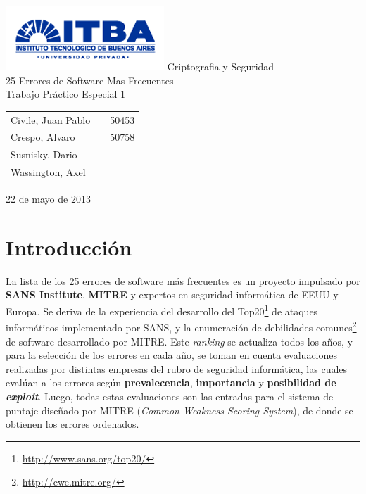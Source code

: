\documentclass[a4paper,10pt]{article}
\begin{document}
\setcounter{secnumdepth}{5}
\setcounter{tocdepth}{5}

\begin{titlepage}
        \vfill
        \thispagestyle{empty}
        \begin{center}
                \includegraphics{./images/itba_logo.png}
                \vfill
                \Huge{Criptografia y Seguridad}\\
                \vspace{1cm}
                \Huge{25 Errores de Software Mas Frecuentes}\\
                \vspace{1cm}
                \Huge{Trabajo Pr\'actico Especial 1}\\
        \end{center}
        \vfill
        \large{
        \begin{tabular}{lcr}
                Civile, Juan Pablo && 50453\\
                Crespo, Alvaro && 50758 \\
                Susnisky, Dario && \\
                Wassington, Axel && \\
        \end{tabular}
}
        \vspace{2cm}
        \begin{center}
                \large{22 de mayo de 2013}\\
        \end{center}
\end{titlepage}
\newpage

\setcounter{page}{1}

\section{Introducción}
La lista de los 25 errores de software más frecuentes es un proyecto impulsado por \textbf{SANS Institute}, \textbf{MITRE} y expertos en seguridad informática de EEUU 
y Europa. Se deriva de la experiencia del desarrollo del Top20\footnote{\url{http://www.sans.org/top20/}} de ataques informáticos
implementado por SANS, y la enumeración de debilidades comunes\footnote{\url{http://cwe.mitre.org/}} de software 
desarrollado por MITRE. Este \emph{ranking} se actualiza todos los años, y para la selección de los errores en cada año,
se toman en cuenta evaluaciones realizadas por distintas empresas del rubro de seguridad informática, las cuales evalúan a
los errores según \textbf{prevalecencia}, \textbf{importancia} y \textbf{posibilidad de \emph{exploit}}. Luego, todas estas
evaluaciones son las entradas para el sistema de puntaje diseñado por MITRE (\emph{Common Weakness Scoring System}), de donde se obtienen los
errores ordenados.\\
 
\end{document}
